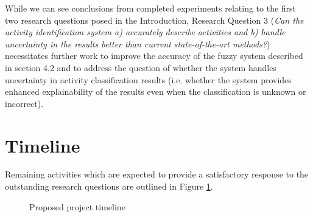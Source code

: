 \documentclass[12pt]{report}
\begin{document}
While we can see conclusions from completed experiments relating to the first two research questions posed in the Introduction, Research Question 3 (\emph{Can the activity identification system a) accurately describe activities and b) handle uncertainty in the results better than current state-of-the-art methods?}) necessitates further work to improve the accuracy of the fuzzy system described in section 4.2 and to address the question of whether the system handles uncertainty in activity classification results (i.e. whether the system provides enhanced explainability of the results even when the classification is unknown or incorrect).

\section{Timeline}
Remaining activities which are expected to provide a satisfactory response to the outstanding research questions are outlined in Figure \ref{timeline}.


\begin{figure}
\noindent{}
\caption{Proposed project timeline}
\label{timeline}
\end{figure}
\end{document}
